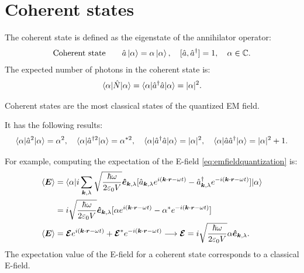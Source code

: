 \section{Coherent states}
The coherent state is defined as the eigenstate of the annihilator operator:
\begin{align*}
    \text{Coherent state}\qquad\hat{a}\left|\alpha\right\rangle=\alpha\left|\alpha\right\rangle,\quad[\hat{a},\hat{a}^\dagger]=1,\quad\alpha\in\mathbb{C}.
\end{align*}
The expected number of photons in the coherent state is:
\begin{align*}
    \langle\alpha|\hat{N}|\alpha\rangle=\langle\alpha|\hat{a}^\dagger\hat{a}|\alpha\rangle=|\alpha|^2.
\end{align*}
\begin{emphasizer}
    Coherent states are the most classical states of the quantized EM field.
\end{emphasizer}
It has the following results:
\begin{align*}
    \langle\alpha|\hat{a}^2|\alpha\rangle=\alpha^2,\quad\langle\alpha|\hat{a}^{\dagger2}|\alpha\rangle=\alpha^{*2},\quad\langle\alpha|\hat{a}^\dagger\hat{a}|\alpha\rangle=|\alpha|^2,\quad\langle\alpha|\hat{a}\hat{a}^\dagger|\alpha\rangle=|\alpha|^2+1.
\end{align*}

For example, computing the expectation of the E-field \eqref{eq:emfieldquantization} is:
\begin{align*}
    \langle\bm{E}\rangle&=\langle\alpha|i\sum_{\bm{k},\lambda}\sqrt{\frac{\hbar\omega}{2\varepsilon_0V}}\bm{\hat{e}}_{\bm{k},\lambda}[\hat{a}_{\bm{k},\lambda}e^{i(\bm{k}\cdot\bm{r}-\omega t)}
    -\hat{a}^\dagger_{\bm{k},\lambda}e^{-i(\bm{k}\cdot\bm{r}-\omega t)}]|\alpha\rangle\\
    &=i\sqrt{\frac{\hbar\omega}{2\varepsilon_0V}}\bm{\hat{e}}_{\bm{k},\lambda}[\alpha e^{i(\bm{k}\cdot\bm{r}-\omega t)}-\alpha^*e^{-i(\bm{k}\cdot\bm{r}-\omega t)}]\\
    \langle\bm{E}\rangle&=\bm{\mathcal{E}}e^{i(\bm{k}\cdot\bm{r}-\omega t)}+\bm{\mathcal{E}}^*e^{-i(\bm{k}\cdot\bm{r}-\omega t)}\longrightarrow\bm{\mathcal{E}}=i\sqrt{\frac{\hbar\omega}{2\varepsilon_0V}}\alpha\bm{\hat{e}}_{\bm{k},\lambda}.
\end{align*}
The expectation value of the E-field for a coherent state corresponds to a classical E-field.

